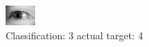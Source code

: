 \begin{figure}[h!]
\begin{center}
\includegraphics[width=0.60\columnwidth]{figures/ID3140_class_3_target_4.png}
\end{center}
\caption{ Classification: 3 actual target: 4}
\label{fig:ID3140_class_3_target_4}
\end{figure}
